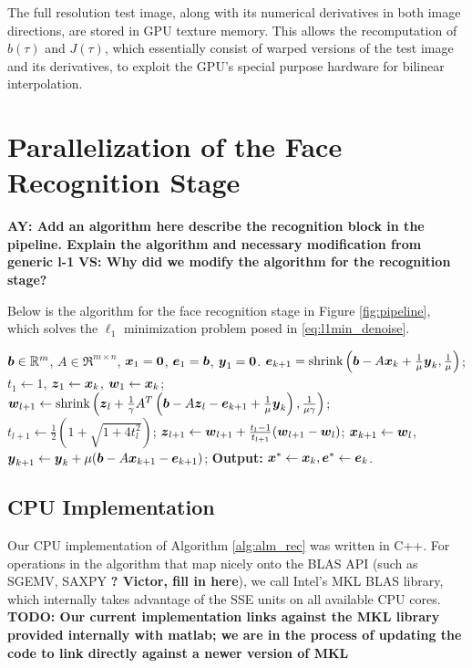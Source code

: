 \documentclass[10pt,twocolumn,letterpaper]{article}
\begin{document}
The full resolution test image, along with its numerical derivatives in both
image directions, are stored in GPU texture memory. This  allows the
recomputation of $b(\tau)$ and $J(\tau)$, which essentially consist of warped
versions of the test image and its derivatives, to exploit the GPU's special
purpose hardware for bilinear interpolation.


\section{Parallelization of the Face Recognition Stage}
\label{sec:recognition}
{\bf AY: Add an algorithm here describe the recognition block in the pipeline. Explain the algorithm and necessary modification from generic l-1}
{\bf VS: Why did we modify the algorithm for the recognition stage? }

Below is the algorithm for the face recognition stage in Figure \ref{fig:pipeline}, which
solves the $\ell_1$ minimization problem posed in \eqref{eq:l1min_denoise}. 

\begin{algorithm}[t]
\caption{\bf (Face Recognition via ALM)}
\begin{algorithmic}[1]
\begin{small}
 ${\boldsymbol{b}} \in {\mathbb{R}}^m$, $A \in \Re^{m \times n}$,
${\boldsymbol{x}}_1 = \boldsymbol{0}$, $\boldsymbol{e}_1 = {\boldsymbol{b}}$, $\boldsymbol{y}_1 =
\boldsymbol{0}$.
\STATE $\boldsymbol{e}_{k+1} = \textup{shrink}\left({\boldsymbol{b}} - A{\boldsymbol{x}}_k +
\frac{1}{\mu}\boldsymbol{y}_k, \frac{1}{\mu}\right)$;
\STATE $t_1\leftarrow 1$, $\boldsymbol{z}_1 \leftarrow {\boldsymbol{x}}_k$, $\boldsymbol{w}_1 \leftarrow {\boldsymbol{x}}_k$;
\STATE $\boldsymbol{w}_{l+1} \leftarrow \textup{shrink}\left(\boldsymbol{z}_l +
\frac{1}{\gamma}A^T\left({\boldsymbol{b}} - A\boldsymbol{z}_l - \boldsymbol{e}_{k+1} +
\frac{1}{\mu}\boldsymbol{y}_k\right), \frac{1}{\mu\gamma}\right)$;
\STATE $t_{l+1} \leftarrow \frac{1}{2}\left( 1 +
\sqrt{1+4t_l^2}\right)$;
\STATE $\boldsymbol{z}_{l+1} \leftarrow \boldsymbol{w}_{l+1} + \frac{t_l - 1}{t_{l+1}}(\boldsymbol{w}_{l+1} - \boldsymbol{w}_l)$;
\ENDWHILE
\STATE ${\boldsymbol{x}}_{k+1} \leftarrow \boldsymbol{w}_{l}$,  \; $\boldsymbol{y}_{k+1} \leftarrow \boldsymbol{y}_k + \mu ({\boldsymbol{b}} - A{\boldsymbol{x}}_{k+1} - \boldsymbol{e}_{k+1})$;
\ENDWHILE \STATE
{\bf Output:} ${\boldsymbol{x}}^* \leftarrow {\boldsymbol{x}}_k, \boldsymbol{e}^* \leftarrow \boldsymbol{e}_k$.
\end{small}
\end{algorithmic}
\label{alg:alm_rec} 
\end{algorithm}

\subsection{CPU Implementation} Our CPU implementation of Algorithm
\ref{alg:alm_rec} was written in C++.  For operations in the algorithm that map
nicely onto the BLAS API (such as SGEMV, SAXPY {\bf? Victor, fill in here}), we
call Intel's MKL BLAS library, which internally takes advantage of the SSE
units on all available CPU cores. 
{\bf TODO: Our current implementation links against the MKL
library provided internally with matlab; we are in the process of updating the code to link directly against a newer version
of MKL}  
\end{document}
